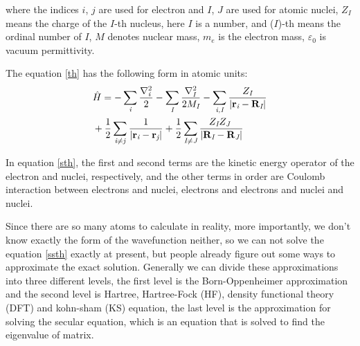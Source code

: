 \documentclass[a4paper]{report}
\begin{document}
\noindent where the indices $\textit{i}$, $\textit{j}$ are used for electron and $\textit{I}$, $\textit{J}$ are used for atomic nuclei, $Z_\textit{I}$ means the charge of the $\textit{I}$-th nucleus,
here  $\textit{I}$ is a number, and ($\textit{I}$)-th means the ordinal number of $\textit{I}$, $\textit{M}$ denotes nuclear mass, $m_e$ is the electron mass, $\varepsilon_0$ is vacuum permittivity.

\noindent The equation \ref{th} has the following form in atomic units:
\
\begin{equation}\label{sth}\begin{split}
&\hath = - \sumi<i>   \frac{{{\nabla}_{\textit{i}}^{2}}}{2} - \sumi<I> \frac{{{\nabla}_{\textit{I}}^{2}}}{2 M_\textit{I}}  - \sumij<i><I> \frac{Z_\textit{I}}{|\textbf{r}_\textit{i}-\textbf{R}_\textit{I}|} \\
& + \frac{1}{2} \suminj<i><j> \frac{1}{ |\textbf{r}_\textit{i}-\textbf{r}_\textit{j}|} + \frac{1}{2} \suminj<I><J> \frac{Z_\textit{I} Z_\textit{J}\ }{|\textbf{R}_\textit{I}-\textbf{R}_\textit{J}|}
\end{split}\end{equation}


\noindent In equation \ref{sth}, the first and second terms are the kinetic energy operator of the electron and nuclei, respectively,
and the other terms in order are Coulomb interaction between electrons and nuclei, electrons and electrons and nuclei and nuclei.

\noindent Since there are so many atoms to calculate in reality, more importantly, we don't know exactly the form of the wavefunction neither,
so we can not solve the equation \ref{ssth} exactly at present, but people already figure out some ways to approximate the exact solution. 
Generally we can divide these approximations into three different levels, the first level is the Born-Oppenheimer approximation and the second level is Hartree,
Hartree-Fock (HF), density functional theory (DFT) and kohn-sham (KS) equation, the last level is the approximation for solving the secular equation, which is an equation that is solved to find the eigenvalue of matrix.
\end{document}
